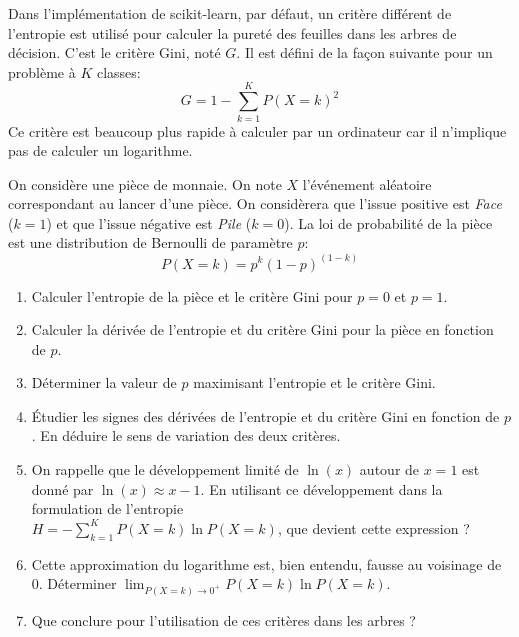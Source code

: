 \documentclass[solutions]{../exercices}
\begin{document}
	\begin{exercice}
		Dans l'implémentation de scikit-learn, par défaut, un critère différent de l'entropie est utilisé pour calculer la pureté des feuilles dans les arbres de décision. C'est le critère Gini, noté $G$. Il est défini de la façon suivante pour un problème à $K$ classes:
		\begin{equation*}
			G = 1 - \sum_{k=1}^K P(X=k)^2
		\end{equation*}
		Ce critère est beaucoup plus rapide à calculer par un ordinateur car il n'implique pas de calculer un logarithme.
		
		On considère une pièce de monnaie. On note $X$ l'événement aléatoire correspondant au lancer d'une pièce. On considèrera que l'issue positive est \textit{Face} ($k = 1$) et que l'issue négative est \textit{Pile} ($k = 0$). La loi de probabilité de la pièce est une distribution de Bernoulli de paramètre $p$:
		\begin{equation*}
			P(X = k) = p^k \left(1 - p\right)^{\left(1 - k\right)}
		\end{equation*}
		\begin{enumerate}
			\item Calculer l'entropie de la pièce et le critère Gini pour $p = 0$ et $p = 1$.
			\item Calculer la dérivée de l'entropie et du critère Gini pour la pièce en fonction de $p$.
			\item Déterminer la valeur de $p$ maximisant l'entropie et le critère Gini.
			\item \'Etudier les signes des dérivées de l'entropie et du critère Gini en fonction de $p$. En déduire le sens de variation des deux critères.
			\item On rappelle que le développement limité de $\ln(x)$ autour de $x=1$ est donné par $\ln(x) \approx x - 1$. En utilisant ce développement dans la formulation de l'entropie \\ \mbox{$H = - \sum_{k=1}^K P(X=k) \ln P(X=k)$}, que devient cette expression ?
			\item Cette approximation du logarithme est, bien entendu, fausse au voisinage de 0. Déterminer $\lim_{P(X=k) \to 0^+} P(X=k) \ln P(X=k)$.
			\item Que conclure pour l'utilisation de ces critères dans les arbres ?
		\end{enumerate}
	\end{exercice}
	
\end{document}
